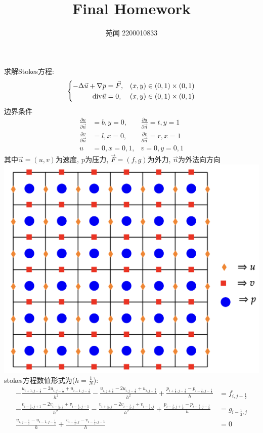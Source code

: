 \documentclass{article}
\title{Final Homework}
\date{苑闻 2200010833}
\begin{document}
\maketitle
求解Stokes方程:\\
\begin{equation}
\label{eq6}
\left\{
\begin{aligned}
-\Delta \vec u + \nabla p &= \vec F, &(x, y) \in (0, 1) \times (0, 1)\\
{\rm div} \vec u &= 0, &(x, y) \in (0, 1) \times (0, 1)\\
\end{aligned}
\right.
\end{equation}
边界条件
\begin{align*}
\frac{\partial u}{\partial \vec n}&=b, y=0,&\frac{\partial u}{\partial \vec n}=t, y=1 \\
\frac{\partial v}{\partial \vec n}&=l, x=0,&\frac{\partial v}{\partial \vec n}=r, x=1 \\
u&=0, x=0,1,&v=0, y=0,1
\end{align*}
其中$\vec u = (u,v)$为速度, p为压力, $\vec F = (f,g)$为外力, $\vec n$为外法向方向\\
\includegraphics[scale=0.5]{image/form.png}\\
stokes方程数值形式为($h=\frac{1}{N}$):
\begin{align*}
-\frac{u_{i+1,j-\frac{1}{2}}-2u_{i,j-\frac{1}{2}}+u_{i-1,j-\frac{1}{2}}}{h^2}
-\frac{u_{i,j+\frac{1}{2}}-2u_{i,j-\frac{1}{2}}+u_{i,j-\frac{3}{2}}}{h^2}
+\frac{p_{i+\frac{1}{2},j-\frac{1}{2}}-p_{i-\frac{1}{2},j-\frac{1}{2}}}{h}
&= f_{i,j-\frac{1}{2}}\\
-\frac{v_{i-\frac{1}{2},j+1}-2v_{i-\frac{1}{2},j}+v_{i-\frac{1}{2},j-1}}{h^2}
-\frac{v_{i+\frac{1}{2},j}-2v_{i-\frac{1}{2},j}+v_{i-\frac{3}{2},j}}{h^2}
+\frac{p_{i-\frac{1}{2},j+\frac{1}{2}}-p_{i-\frac{1}{2},j-\frac{1}{2}}}{h}
&= g_{i-\frac{1}{2},j}\\
\frac{u_{i,j-\frac{1}{2}}-u_{i-1,j-\frac{1}{2}}}{h}
+\frac{v_{i-\frac{1}{2},j}-v_{i-\frac{1}{2},j-1}}{h} &= 0
\end{align*}
\end{document}
